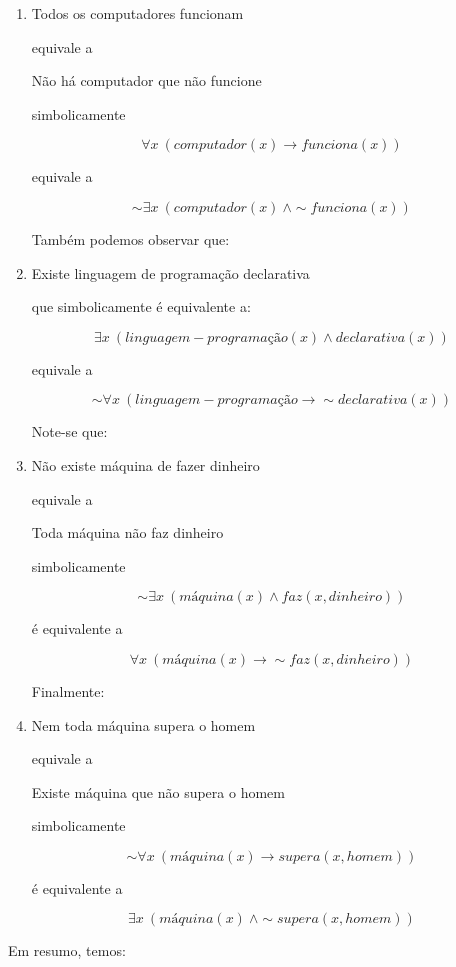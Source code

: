 \begin{enumerate}[label=(\roman*)]
    \item Todos os computadores funcionam

    equivale a

    \centerline{Não há computador que não funcione}

    simbolicamente

    $$\forall x\ (computador(x) \to funciona(x))$$

    equivale a

    $$\sim \exists x\ (computador(x)\ \land \sim funciona(x))$$

    \bigskip
    Também podemos observar que:

    \item Existe linguagem de programação declarativa

    que simbolicamente é equivalente a:

    $$\exists x\ (linguagem-programação(x) \land declarativa(x))$$

    equivale a

    $$\sim \forall x\ (linguagem-programação \to \sim declarativa(x))$$

    \bigskip
    Note-se que:
    \item Não existe máquina de fazer dinheiro

    equivale a

    \centerline{Toda máquina não faz dinheiro}

    simbolicamente

    $$\sim \exists x\ (máquina(x) \land faz(x, dinheiro))$$

    é equivalente a

    $$\forall x\ (máquina(x) \to \sim faz(x, dinheiro))$$

    \bigskip
    Finalmente:
    \item Nem toda máquina supera o homem

    equivale a

    \centerline{Existe máquina que não supera o homem}

    simbolicamente

    $$\sim \forall x\ (máquina(x) \to supera(x, homem))$$

    é equivalente a

    $$\exists x\ (máquina(x)\ \land \sim supera(x, homem))$$

\end{enumerate}

Em resumo, temos:

